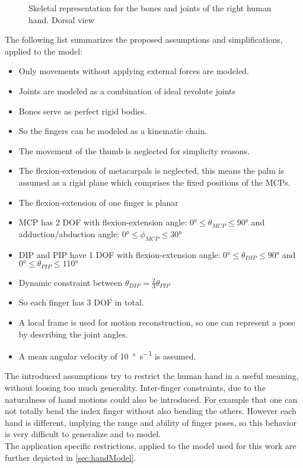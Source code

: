\begin{figure}[h]
\centering
	\hfill
\caption{Skeletal representation for the bones and joints of the right human hand. Dorsal view \cite{bullock2012assessing}}
\label{fig:skeletHand}
\end{figure}

The following list summarizes the proposed assumptions and simplifications, applied to the model:
\begin{itemize}
\item Only movements without applying external forces are modeled.
\item Joints are modeled as a combination of ideal revolute joints
\item Bones serve as perfect rigid bodies.
\item So the fingers can be modeled as a kinematic chain.
\item The movement of the thumb is neglected for simplicity reasons.
\item The flexion-extension of metacarpals is neglected, this means the palm is assumed as a rigid plane which comprises the fixed positions of the \acp{MCP}.
\item The flexion-extension of one finger is planar
\item \ac{MCP} has 2 \ac{DOF} with flexion-extension angle: $ \ang{0} \leq \theta_{MCP} \leq \ang{90} $ and adduction/abduction angle: $ \ang{0} \leq \phi_{MCP} \leq \ang{30} $
\item \ac{DIP} and \ac{PIP} have 1 DOF with flexion-extension angle: $ \ang{0} \leq \theta_{DIP} \leq \ang{90} $ and $ \ang{0} \leq \theta_{PIP} \leq \ang{110} $
\item Dynamic constraint between $ \theta_{DIP} = \frac{2}{3} \theta_{PIP} $
\item So each finger has 3 \ac{DOF} in total.
\item A local frame is used for motion reconstruction, so one can represent a pose by describing the joint angles.
\item A mean angular velocity of \SI[per-mode=symbol]{10}{\degree \per \second} is assumed.
\end{itemize}

The introduced assumptions try to restrict the human hand in a useful meaning, without loosing too much generality. Inter-finger constraints, due to the naturalness of hand motions could also be introduced. For example that one can not totally bend the index finger without also bending the others. However each hand is different, implying the range and ability of finger poses, so this behavior is very difficult to generalize and to model. \\
The application specific restrictions, applied to the model used for this work are further depicted in \ref{sec:handModel}. \\



